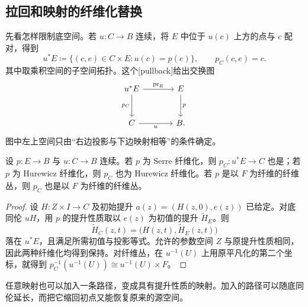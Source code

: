 \subsection{拉回和映射的纤维化替换}
\label{g2:subsec:0802:04}

先看怎样限制底空间。若 \(u:C\rightarrow B\) 连续，将 \(E\) 中位于 \(u(c)\) 上方的点与 \(c\) 配对，得到
\[
	u^*E\coloneqq\{(c,e)\in C\times E:u(c)=p(e)\},
	\qquad p_C(c,e)=c.
\]
其中取乘积空间的子空间拓扑。这个[pullback]给出交换图
\[
	\begin{tikzcd}[column sep=large,row sep=large]
		u^*E \arrow[r,"\operatorname{pr}_E"] \arrow[d,"p_C"'] & E \arrow[d,"p"] \\
		C \arrow[r,"u"'] & B.
	\end{tikzcd}
\]
图中左上空间只由“右边投影与下边映射相等”的条件确定。

\begin{proposition}\label{g2:prop:fibration-pullback}
	设 \(p:E\rightarrow B\) 与 \(u:C\rightarrow B\) 连续。若 \(p\) 为 Serre 纤维化，则 \(p_C:u^*E\rightarrow C\) 也是；若 \(p\) 为 Hurewicz 纤维化，则 \(p_C\) 也为 Hurewicz 纤维化。若 \(p\) 是以 \(F\) 为纤维的纤维丛，则 \(p_C\) 也是以 \(F\) 为纤维的纤维丛。
\end{proposition}
\begin{proof}
	设 \(H:Z\times I\rightarrow C\) 及初始提升 \(a(z)=(H(z,0),e(z))\) 已给定。对底同伦 \(uH\)，用 \(p\) 的提升性质取以 \(e(z)\) 为初值的提升 \(\widetilde H_E\)。则
	\[
		\widetilde H_C(z,t)=\bigl(H(z,t),\widetilde H_E(z,t)\bigr)
	\]
	落在 \(u^*E\)，且满足所需初值与投影等式。允许的参数空间 \(Z\) 与原提升性质相同，因此两种纤维化均得到保持。对纤维丛，在 \(u^{-1}(U)\) 上用原平凡化的第二个坐标，就得到 \(p_C^{-1}(u^{-1}(U))\cong u^{-1}(U)\times F\)。
\end{proof}

任意映射也可以加入一条路径，变成具有提升性质的映射。加入的路径可以随底同伦延长，而把它缩回初点又能恢复原来的源空间。


